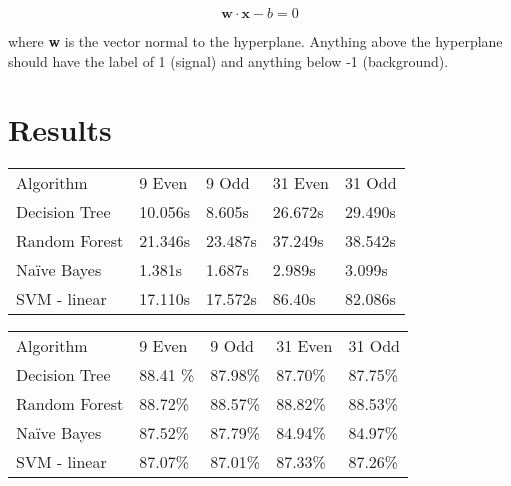 \documentclass[aps, reprint, amsmath, amssymb]{revtex4-1}
\begin{document}
\begin{equation}
\mathbf{w} \cdot \mathbf{x} - b = 0
\end{equation}

where \textbf{w} is the vector normal to the hyperplane.  Anything above the hyperplane should have the label of 1 (signal) and anything below -1 (background).  

\section{Results}

\begin{center}
  \begin{tabular}{ | l || l | l | l | l |}
    \hline
    Algorithm & 9 Even & 9 Odd & 31 Even & 31 Odd \\ \hhline{|=||=|=|=|=|}
    Decision Tree & 10.056s & 8.605s & 26.672s & 29.490s \\ \hline
    Random Forest & 21.346s & 23.487s & 37.249s & 38.542s \\ \hline
    Na{\"i}ve Bayes & 1.381s & 1.687s & 2.989s & 3.099s \\ \hline
    SVM - linear & 17.110s & 17.572s & 86.40s & 82.086s \\ \hline
    \hline
  \end{tabular}
\end{center}


\begin{center}
  \begin{tabular}{ | l || l | l | l | l |}
    \hline
    Algorithm & 9 Even & 9 Odd & 31 Even & 31 Odd \\ \hhline{|=||=|=|=|=|}

    Decision Tree & 88.41 \% & 87.98\% & 87.70\% & 87.75\% \\ \hline

    Random Forest & 88.72\% & 88.57\% &  88.82\% & 88.53\% \\ \hline

    Na{\"i}ve Bayes & 87.52\% & 87.79\% & 84.94\% & 84.97\% \\ \hline

    SVM - linear & 87.07\% & 87.01\% & 87.33\% & 87.26\% \\ \hline
    \hline
  \end{tabular}
\end{center}
\end{document}

